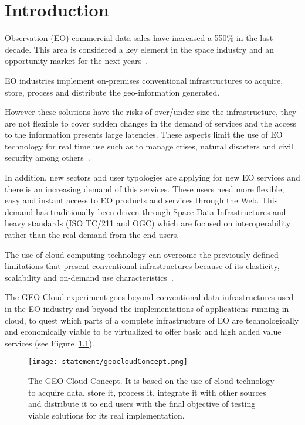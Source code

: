 \chapter{Introduction}

 Observation (\acs{EO}) commercial data sales have increased a 550\% in
the last decade. This area is considered a key element in the
space industry and an opportunity market for the next years~\cite{Euroconsult2010}.

\ac{EO} industries implement on-premises conventional infrastructures to acquire,
store, process and distribute the geo-information generated.

However these solutions have the risks of over/under size the infrastructure, they are not flexible to cover sudden changes in the demand of services and the access to the information presents large latencies.  These aspects limit the use of \ac{EO} technology for real time use such as to manage crises, natural disasters and civil security among others~\cite{Deren2007}.

In addition, new sectors and user typologies are applying for new \ac{EO} services
and there is an increasing demand of this services. These users
need more flexible, easy and instant access to \ac{EO} products and services through
the Web. This demand has traditionally been driven through Space Data
Infrastructures and heavy standards (\acs{ISO} TC/211 and \ac{OGC}) which are focused on
interoperability rather than the real demand from the end-users.

The use of cloud computing technology can overcome the previously defined limitations that present conventional infrastructures because of its elasticity, scalability and on-demand use characteristics~\cite{Ambrust2010}.

The GEO-Cloud experiment goes beyond conventional data infrastructures used in
the \ac{EO}
industry and beyond the implementations of applications running in cloud, to
quest which parts of a complete infrastructure of \ac{EO} are technologically and
economically viable to be virtualized to offer basic and high added value
services (see Figure~\ref{fig:intr-geocloudConcept}).

\begin{figure}[!h]
\begin{center}
\texttt{[image: statement/geocloudConcept.png]}
\caption[The GEO-Cloud Concept.]{The GEO-Cloud Concept. It is based on the use of cloud technology to acquire data, store it, process it, integrate it with other sources and distribute it to end users with the final objective of testing viable solutions for its real implementation.}
\label{fig:intr-geocloudConcept}
\end{center}
\end{figure}

